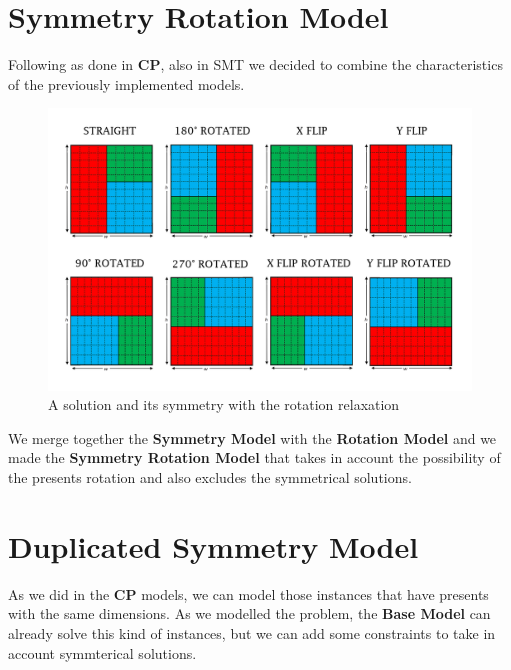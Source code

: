 

\newpage
\section{Symmetry Rotation Model}
Following as done in \textbf{CP}, also in SMT we decided to combine the characteristics of the previously implemented models.

\begin{figure}[ht]
	\centering
	\includegraphics[width=\textwidth]{images/rotated_simmetry.png}
	\caption{A solution and its symmetry with the rotation relaxation}
	\label{fig:overlaps}
\end{figure}

We merge together the \textbf{Symmetry Model} with the \textbf{Rotation Model} and we made
the \textbf{Symmetry Rotation Model} that takes in account the possibility of the presents rotation and also excludes the symmetrical
solutions.



\newpage
\section{Duplicated Symmetry Model}
As we did in the \textbf{CP} models, we can model those instances that have presents with the same dimensions. As we modelled the problem,
the \textbf{Base Model} can already solve this kind of instances, but we can add some constraints to take in account symmterical solutions.


